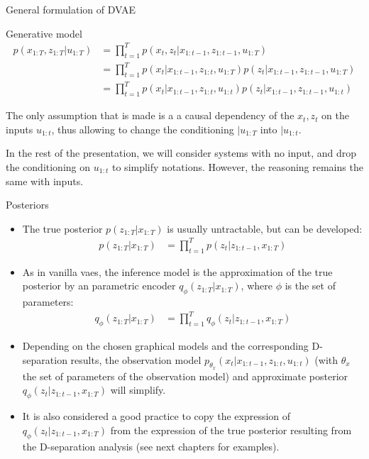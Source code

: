 \begin{frame}{General formulation of DVAE}
    \begin{block}{Generative model}
        \begin{align*}
            p(x_{1:T}, z_{1:T} \vert u_{1:T}) &= \prod_{t=1}^T p(x_t, z_t \vert x_{1:t-1}, z_{1:t-1}, u_{1:T}) \\
            &= \prod_{t=1}^T p(x_t \vert x_{1:t-1}, z_{1:t}, u_{1:T}) p(z_t \vert x_{1:t-1}, z_{1:t-1}, u_{1:T}) \\
            &= \prod_{t=1}^T p(x_t \vert x_{1:t-1}, z_{1:t}, u_{1:t}) p(z_t \vert x_{1:t-1}, z_{1:t-1}, u_{1:t})
        \end{align*}
    \end{block}
    The only assumption that is made is a a causal dependency of the $x_t, z_t$ on the inputs $u_{1:t}$, thus allowing to change the conditioning $\vert u_{1:T}$ into $\vert u_{1:t}$.

    In the rest of the presentation, we will consider systems with no input, and drop the conditioning on $u_{1:t}$ to simplify notations. However, the reasoning remains the same with inputs.
\end{frame}

\begin{frame}{Posteriors}
    \begin{itemize}
        \item <1-> The true posterior  $p(z_{1:T} \vert x_{1:T})$ is usually untractable, but can be developed:
            \begin{align*}
                p(z_{1:T} \vert x_{1:T}) &= \prod_{t=1}^T p(z_t \vert z_{1:t-1}, x_{1:T})
            \end{align*}
        \item <2-> As in vanilla \glspl{vae}, the inference model is the approximation of the true posterior by an parametric encoder $q_{\phi}(z_{1:T} \vert x_{1:T})$, where $\phi$ is the set of parameters:
            \begin{align*}
                q_{\phi}(z_{1:T} \vert x_{1:T}) &= \prod_{t=1}^T q_\phi(z_t \vert z_{1:t-1}, x_{1:T})
            \end{align*}
        \item <3-> Depending on the chosen graphical models and the corresponding D-separation results, the observation model $p_{\theta_x}(x_t \vert x_{1:t-1}, z_{1:t}, u_{1:t})$ (with $\theta_x$ the set of parameters of the observation model) and approximate posterior $q_\phi(z_t \vert z_{1:t-1}, x_{1:T})$ will simplify. 
        \item <4-> It is also considered a good practice to copy the expression of $q_\phi(z_t \vert z_{1:t-1}, x_{1:T})$ from the expression of the true posterior resulting from the D-separation analysis (see next chapters for examples).
    \end{itemize}
\end{frame}

